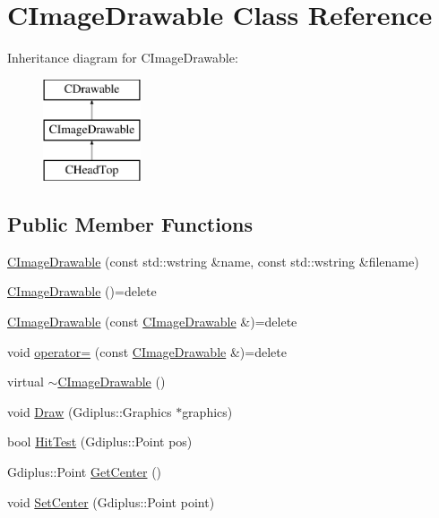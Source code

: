\hypertarget{class_c_image_drawable}{}\section{C\+Image\+Drawable Class Reference}
\label{class_c_image_drawable}
Inheritance diagram for C\+Image\+Drawable\+:\begin{figure}[H]
\begin{center}
\leavevmode
\includegraphics[height=3.000000cm]{class_c_image_drawable}
\end{center}
\end{figure}
\subsection*{Public Member Functions}
\begin{DoxyCompactItemize}
\item 
\hyperlink{class_c_image_drawable_a0a036788340edfd1765ae6a05cee31a0}{C\+Image\+Drawable} (const std\+::wstring \&name, const std\+::wstring \&filename)
\item 
\hyperlink{class_c_image_drawable_a0af067ad80ece0bea046dded19c5b9d4}{C\+Image\+Drawable} ()=delete
\item 
\hyperlink{class_c_image_drawable_a2955356238c638373d39ed99c5422cf3}{C\+Image\+Drawable} (const \hyperlink{class_c_image_drawable}{C\+Image\+Drawable} \&)=delete
\item 
void \hyperlink{class_c_image_drawable_a717129f6ce9e9fa5d9a512a85a33a8b1}{operator=} (const \hyperlink{class_c_image_drawable}{C\+Image\+Drawable} \&)=delete
\item 
virtual \hyperlink{class_c_image_drawable_a4ecb6e494ba125a2d503bfff1260c2fe}{$\sim$\+C\+Image\+Drawable} ()
\item 
void \hyperlink{class_c_image_drawable_abf591e6f5e92537119ab745eba054bd1}{Draw} (Gdiplus\+::\+Graphics $\ast$graphics)
\item 
bool \hyperlink{class_c_image_drawable_ac9f173d9fcb21dbb45f4cbf4593a6984}{Hit\+Test} (Gdiplus\+::\+Point pos)
\item 
Gdiplus\+::\+Point \hyperlink{class_c_image_drawable_adaf3918b7eafe6c3db2c73ffa317f114}{Get\+Center} ()
\item 
void \hyperlink{class_c_image_drawable_a912dff765a064ebd0d434b1d024f2194}{Set\+Center} (Gdiplus\+::\+Point point)
\end{DoxyCompactItemize}
